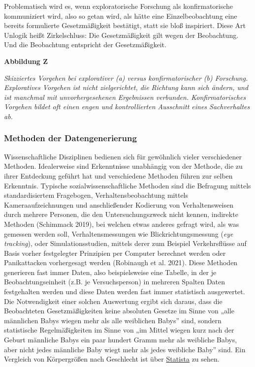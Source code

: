 \documentclass[
  letterpaper,
  DIV=11,
  numbers=noendperiod]{scrreprt}
\begin{document}
Problematisch wird es, wenn exploratorische Forschung als
konfirmatorische kommuniziert wird, also so getan wird, als hätte eine
Einzelbeobachtung eine bereits formulierte Gesetzmäßigkeit bestätigt,
statt sie bloß inspiriert. Diese Art Unlogik heißt Zirkelschluss: Die
Gesetzmäßigkeit gilt wegen der Beobachtung. Und die Beobachtung
entspricht der Gesetzmäßigkeit.

\textbf{Abbildung Z}

\emph{Skizziertes Vorgehen bei explorativer (a) versus konfirmatorischer
(b) Forschung. Exploratives Vorgehen ist nicht zielgerichtet, die
Richtung kann sich ändern, und ist manchmal mit unvorhergesehenen
Ergebnissen verbunden. Konfirmatorisches Vorgehen bildet oft einen engen
und kontrollierten Ausschnitt eines Sachverhaltes ab.}

\subsubsection{Methoden der
Datengenerierung}\label{methoden-der-datengenerierung}

Wissenschaftliche Disziplinen bedienen sich für gewöhnlich vieler
verschiedener Methoden. Idealerweise sind Erkenntnisse unabhängig von
der Methode, die zu ihrer Entdeckung geführt hat und verschiedene
Methoden führen zur selben Erkenntnis. Typische sozialwissenschaftliche
Methoden sind die Befragung mittels standardisiertem Fragebogen,
Verhaltensbeobachtung mittels Kameraaufzeichnungen und anschließender
Kodierung von Verhaltensweisen durch mehrere Personen, die den
Untersuchungszweck nicht kennen, indirekte Methoden (Schimmack 2019),
bei welchen etwas anderes gefragt wird, als was gemessen werden soll,
Verhaltensmessungen wie Blickrichtungsmessung (\emph{eye tracking}),
oder Simulationsstudien, mittels derer zum Beispiel Verkehrsflüsse auf
Basis vorher festgelegter Prinzipien per Computer berechnet werden oder
Panikattacken vorhergesagt werden (Robinaugh et al. 2021). Diese
Methoden generieren fast immer Daten, also beispielsweise eine Tabelle,
in der je Beobachtungseinheit (z.B. je Versuchsperson) in mehreren
Spalten Daten festgehalten werden und diese Daten werden fast immer
statistisch ausgewertet. Die Notwendigkeit einer solchen Auswertung
ergibt sich daraus, dass die Beobachteten Gesetzmäßigkeiten keine
absoluten Gesetze im Sinne von „alle männlichen Babys wiegen mehr als
alle weiblichen Babys'' sind, sondern statistische Regelmäßigkeiten im
Sinne von „im Mittel wiegen kurz nach der Geburt männliche Babys ein
paar hundert Gramm mehr als weibliche Babys, aber nicht jedes männliche
Baby wiegt mehr als jedes weibliche Baby'' sind. Ein Vergleich von
Körpergrößen nach Geschlecht ist über
\href{https://de.statista.com/statistik/daten/studie/1825/umfrage/koerpergroesse-nach-geschlecht/}{Statista}
zu sehen.
\end{document}
